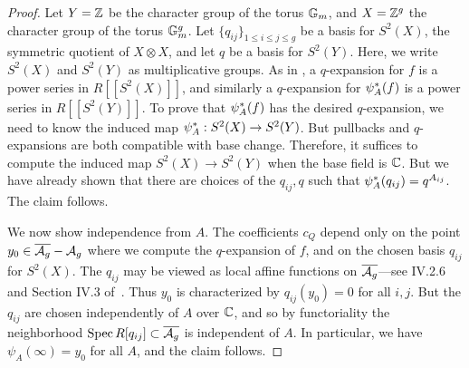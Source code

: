 \documentclass{amsart}
\begin{document}
\begin{proof}
  Let $Y = \mathbb{Z}$ be the character group of the torus $\mathbb{G}_m$, and $X = \mathbb{Z}^g$ the character group of the torus $\mathbb{G}_m^g$. Let $\{ q_{ij}\}_{1 \leq i \leq j \leq g}$ be a basis for $S^2(X)$, the symmetric quotient of $X \otimes X$, and let $q$ be a basis for $S^2(Y)$. Here, we write $S^2(X)$ and $S^2(Y)$ as multiplicative groups. As in \cite[Section V.1]{faltings1990degeneration}, a $q$-expansion for $f$ is a power series in $R[[S^2(X)]]$, and similarly a $q$-expansion for $\psi_{A}^*(f)$ is a power series in $R[[S^2(Y)]]$. To prove that $\psi_{A}^*(f)$ has the desired $q$-expansion, we need to know the induced map $\psi_{A}^*: S^2(X) \to S^2(Y)$. But pullbacks and $q$-expansions are both compatible with base change. Therefore, it suffices to compute the induced map $S^2(X) \to S^2(Y)$ when the base field is $\mathbb{C}$. But we have already shown that there are choices of the $q_{ij}, q$ such that $\psi_{A}^*(q_{ij}) = q^{A_{ij}}$. The claim follows.

  We now show independence from $A$. The coefficients $c_Q$ depend only on the point $y_0 \in \overline{\mathcal{A}_g} - \mathcal{A}_g$ where we compute the $q$-expansion of $f$, and on the chosen basis $q_{ij}$ for $S^2(X)$. The $q_{ij}$ may be viewed as local affine functions on $\overline{\mathcal{A}_g}$---see IV.2.6 and Section IV.3 of~\cite{faltings1990degeneration}. Thus $y_0$ is characterized by $q_{ij}(y_0) = 0$ for all $i,j$. But the $q_{ij}$ are chosen independently of $A$ over $\mathbb{C}$, and so by functoriality the neighborhood $\operatorname{Spec} R[q_{ij}] \subset \overline{\mathcal{A}_g}$ is independent of $A$. In particular, we have $\psi_A(\infty) = y_0$ for all $A$, and the claim follows. 

\end{proof}
\end{document}
